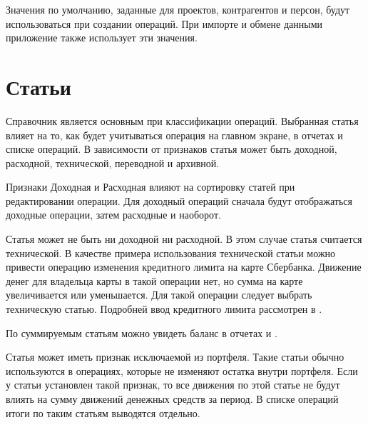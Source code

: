 \documentclass[a4paper,10pt,russian]{sphinxmanual}
\begin{document}
\sphinxAtStartPar
Значения по умолчанию, заданные для проектов, контрагентов и персон, будут использоваться при создании операций. При
импорте и обмене данными приложение также использует эти значения.

\noindent{}
\noindent{}
\noindent{}


\section{Статьи}
\label{\detokenize{directories:id5}}
\sphinxAtStartPar
Справочник  является основным при классификации операций. Выбранная статья влияет на то, как будет учитываться
операция на главном экране, в отчетах и списке операций. В зависимости от признаков статья может быть доходной, расходной,
технической, переводной и архивной.

\sphinxAtStartPar
Признаки Доходная и Расходная влияют на сортировку статей при редактировании операции. Для доходный операций сначала
будут отображаться доходные операции, затем расходные и наоборот.

\sphinxAtStartPar
Статья может не быть ни доходной ни расходной. В этом случае статья считается технической. В качестве примера использования
технической статьи можно привести операцию изменения кредитного лимита на карте Сбербанка.
Движение денег для владельца карты в такой операции нет, но сумма на карте увеличивается или уменьшается.
Для такой операции следует выбрать техническую статью. Подробней  ввод кредитного лимита
рассмотрен в .

\sphinxAtStartPar
По суммируемым статьям можно увидеть баланс в отчетах  и .

\sphinxAtStartPar
Статья может иметь признак исключаемой из портфеля. Такие статьи обычно используются в операциях,
которые не изменяют остатка внутри портфеля. Если у статьи установлен такой признак,
то все движения по этой статье не будут влиять на сумму движений денежных средств за период.
В списке операций итоги по таким статьям выводятся отдельно.
\end{document}
